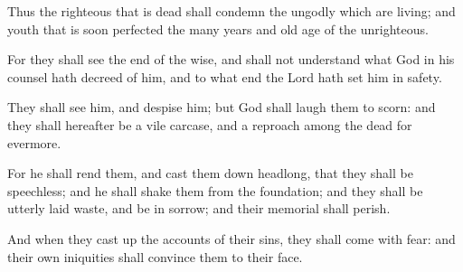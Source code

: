 {\par }{\PP {}Thus the righteous that is dead shall condemn the ungodly which are living; and youth that is soon perfected the many years and old age of the unrighteous.
\par }{\PP {}For they shall see the end of the wise, and shall not understand what God in his counsel hath decreed of him, and to what end the Lord hath set him in safety.
\par }{\PP {}They shall see him, and despise him; but God shall laugh them to scorn: and they shall hereafter be a vile carcase, and a reproach among the dead for evermore.
\par }{\PP {}For he shall rend them, and cast them down headlong, that they shall be speechless; and he shall shake them from the foundation; and they shall be utterly laid waste, and be in sorrow; and their memorial shall perish.
\par }{\PP {}And when they cast up the accounts of their sins, they shall come with fear: and their own iniquities shall convince them to their face.

}

